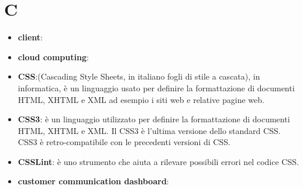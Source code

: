 \section{C}
\begin{itemize}
	\item \textbf{client}:
	\item \textbf{cloud computing}:
	\item \textbf{CSS}:(Cascading Style Sheets, in italiano fogli di stile a cascata), in informatica, è un linguaggio usato per definire la formattazione di documenti HTML, XHTML e XML ad esempio i siti web e relative pagine web.
	\item \textbf{CSS3}: è un linguaggio utilizzato per definire la formattazione di documenti HTML, XHTML e XML. Il CSS3 è l'ultima versione dello standard CSS. CSS3 è retro-compatibile con le precedenti versioni di CSS.
	\item \textbf{CSSLint}: è uno strumento che aiuta a rilevare possibili errori nel codice CSS.
	\item \textbf{customer communication dashboard}:
\end{itemize}